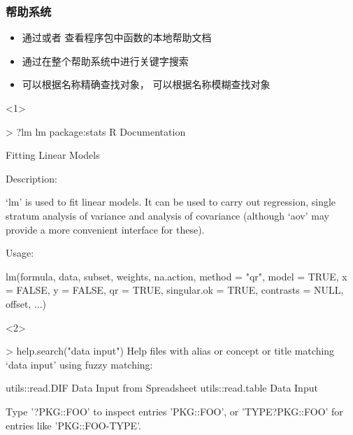 \subsubsection{帮助系统}
\begin{frame}[t,fragile]{\subsecname}{\subsubsecname}
\begin{itemize}
\item<1-> 通过或者
               查看程序包中函数的本地帮助文档
\item<2-> 通过在整个帮助系统中进行关键字搜索
\item<3-> 可以根据名称精确查找对象，
               可以根据名称模糊查找对象
\end{itemize}

\begin{overlayarea}{\textwidth}{\textheight}
\begin{onlyenv}<1>
\begin{rcode}
> ?lm
lm               package:stats            R Documentation

Fitting Linear Models

Description:

     ‘lm’ is used to fit linear models.  It can be used to carry out regression, single stratum analysis of variance and analysis of covariance (although ‘aov’ may provide a more convenient interface for these).

Usage:

     lm(formula, data, subset, weights, na.action, method = "qr", model = TRUE, x = FALSE, y = FALSE, qr = TRUE, singular.ok = TRUE, contrasts = NULL, offset, ...)
\end{rcode}
\end{onlyenv}

\begin{onlyenv}<2>
\begin{rcode}
> help.search("data input")
Help files with alias or concept or title matching ‘data input’ using fuzzy matching:


utils::read.DIF         Data Input from Spreadsheet
utils::read.table       Data Input


Type '?PKG::FOO' to inspect entries 'PKG::FOO', or 'TYPE?PKG::FOO' for entries like 'PKG::FOO-TYPE'.
\end{rcode}
\end{onlyenv}


\end{overlayarea}
\end{frame}

